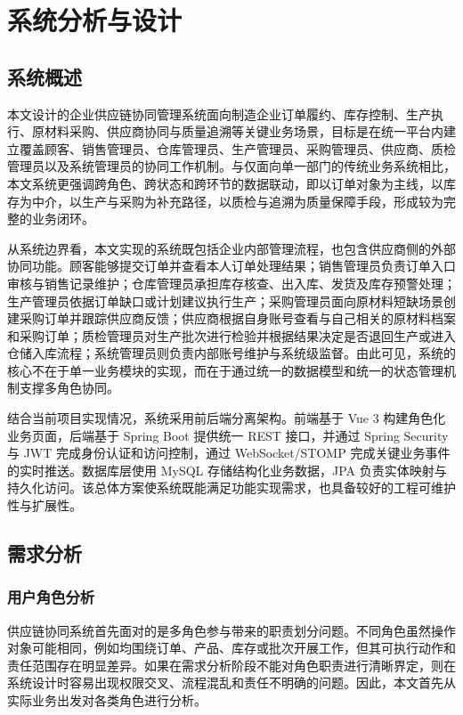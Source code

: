 \chapter{系统分析与设计}

\section{系统概述}

本文设计的企业供应链协同管理系统面向制造企业订单履约、库存控制、生产执行、原材料采购、供应商协同与质量追溯等关键业务场景，目标是在统一平台内建立覆盖顾客、销售管理员、仓库管理员、生产管理员、采购管理员、供应商、质检管理员以及系统管理员的协同工作机制。与仅面向单一部门的传统业务系统相比，本文系统更强调跨角色、跨状态和跨环节的数据联动，即以订单对象为主线，以库存为中介，以生产与采购为补充路径，以质检与追溯为质量保障手段，形成较为完整的业务闭环。

从系统边界看，本文实现的系统既包括企业内部管理流程，也包含供应商侧的外部协同功能。顾客能够提交订单并查看本人订单处理结果；销售管理员负责订单入口审核与销售记录维护；仓库管理员承担库存核查、出入库、发货及库存预警处理；生产管理员依据订单缺口或计划建议执行生产；采购管理员面向原材料短缺场景创建采购订单并跟踪供应商反馈；供应商根据自身账号查看与自己相关的原材料档案和采购订单；质检管理员对生产批次进行检验并根据结果决定是否退回生产或进入仓储入库流程；系统管理员则负责内部账号维护与系统级监督。由此可见，系统的核心不在于单一业务模块的实现，而在于通过统一的数据模型和统一的状态管理机制支撑多角色协同。

结合当前项目实现情况，系统采用前后端分离架构。前端基于 Vue 3 构建角色化业务页面，后端基于 Spring Boot 提供统一 REST 接口，并通过 Spring Security 与 JWT 完成身份认证和访问控制，通过 WebSocket/STOMP 完成关键业务事件的实时推送。数据库层使用 MySQL 存储结构化业务数据，JPA 负责实体映射与持久化访问。该总体方案使系统既能满足功能实现需求，也具备较好的工程可维护性与扩展性。

\section{需求分析}

\subsection{用户角色分析}

供应链协同系统首先面对的是多角色参与带来的职责划分问题。不同角色虽然操作对象可能相同，例如均围绕订单、产品、库存或批次开展工作，但其可执行动作和责任范围存在明显差异。如果在需求分析阶段不能对角色职责进行清晰界定，则在系统设计时容易出现权限交叉、流程混乱和责任不明确的问题。因此，本文首先从实际业务出发对各类角色进行分析。

